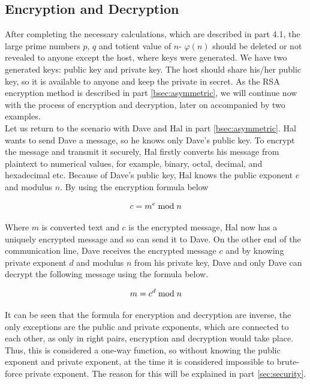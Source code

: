 \documentclass[a4paper, 12pt]{article}
\begin{document}
\subsection{Encryption and Decryption}
\label{bsec:ed}

After completing the necessary calculations, which are described in part 4.1, the large prime
numbers $p$, $q$ and totient value of $n$- $\varphi(n)$ should be deleted or not revealed to anyone except the
host, where keys were generated. We have two generated keys: public key and private key. The
host should share his/her public key, so it is available to anyone and keep the private in secret. As
the RSA encryption method is described in part \ref{bsec:asymmetric}, we will continue now with the process of
encryption and decryption, later on accompanied by two examples.\\

Let us return to the scenario with Dave and Hal in part \ref{bsec:asymmetric}. Hal wants to send Dave a message, so
he knows only Dave's public key. To encrypt the message and transmit it securely, Hal firstly
converts his message from plaintext to numerical values, for example, binary, octal, decimal, and
hexadecimal etc. Because of Dave's public key, Hal knows the public exponent $e$ and modulus $n$.
By using the encryption formula below

\begin{equation*}
  c = m^e \bmod n\\
  \end{equation*}

Where $m$ is converted text and $c$ is the encrypted message, Hal now has a uniquely encrypted
message and so can send it to Dave. On the other end of the communication line, Dave receives
the encrypted message $c$ and by knowing private exponent $d$ and modulus $n$ from his private key,
Dave and only Dave can decrypt the following message using the formula below.

\begin{equation*}
  m = c^d \bmod n\\
\end{equation*}

It can be seen that the formula for encryption and decryption are inverse, the only exceptions are
the public and private exponents, which are connected to each other, as only in right pairs,
encryption and decryption would take place. Thus, this is considered a one-way function, so
without knowing the public exponent and private exponent, at the time it is considered impossible
to brute-force private exponent. The reason for this will be explained in part \ref{sec:security}.
\end{document}
